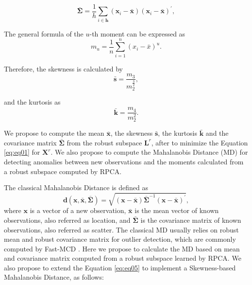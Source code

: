 \documentclass[review]{elsarticle}
\begin{document}
\begin{equation}\label{eq:eq03}
	\boldsymbol{\bar{\Sigma}} = \displaystyle\frac{1}{h}\displaystyle\sum_{i\in \boldsymbol{h}} (\boldsymbol{x}_i - \bar{\boldsymbol{x}})(\boldsymbol{x}_i - \bar{\boldsymbol{x}})^\prime,
\end{equation}

The general formula of the $u$-th moment can be expressed as
\begin{equation}\label{eq:eq04}
	m_u = \displaystyle\frac{1}{n}\displaystyle\sum_{i = 1}^{n}( x_i - \bar{x})^u.
\end{equation}

Therefore, the skewness is calculated by
\begin{equation}\label{eq:eq05}
	\boldsymbol{\bar{s}} = \frac{m_3}{m_2^{\frac{3}{2}}},
\end{equation}

and the kurtosis as
\begin{equation}\label{eq:eq06}
	\boldsymbol{\bar{k}} = \frac{m_4}{m_2^2}.
\end{equation}

We propose to compute the mean $\boldsymbol{\bar{x}}$, the skewness $\boldsymbol{\bar{s}}$, the kurtosis $\boldsymbol{\bar{k}}$ and the covariance matrix $\boldsymbol{\bar{\Sigma}}$ from the robust subspace $\boldsymbol{L}^r$, after to minimize the Equation \ref{eq:eq01} for $\textbf{X}^r$. We also propose to compute the Mahalanobis Distance (MD) for detecting anomalies between new observations and the moments calculated from a robust subspace computed by RPCA. 

The classical Mahalanobis Distance is defined as		
\begin{equation}\label{eq:eq07}
	\boldsymbol{d}(\boldsymbol{x},\bar{\boldsymbol{x}}, \boldsymbol{\bar{\Sigma}}) = \sqrt{(\boldsymbol{x} - \bar{\boldsymbol{x}}) \boldsymbol{\bar{\Sigma}}^{-1}(\boldsymbol{x} - \bar{\boldsymbol{x}})^\prime},
\end{equation}
where $\boldsymbol{x}$ is a vector of a new observation, $\bar{\boldsymbol{x}}$ is the mean vector of known observations, also referred as location, and $\boldsymbol{\bar{\Sigma}}$ is the covariance matrix of known observations, also referred as scatter. The classical MD usually relies on robust mean and robust covariance matrix for outlier detection, which are commonly computed by Fast-MCD \cite{rousseeuw1984mcd, rousseeuw1999fastmcd}. Here we propose to calculate the MD based on mean and covariance matrix computed from a robust subspace learned by RPCA. We also propose to extend the Equation \ref{eq:eq05} to implement a Skewness-based Mahalanobis Distance, as follows:
\end{document}
